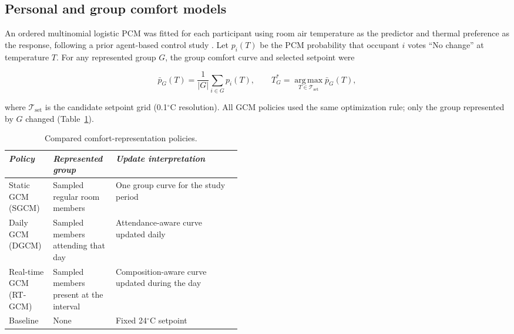 \subsection{Personal and group comfort models}
An ordered multinomial logistic PCM was fitted for each participant using room air temperature as the predictor and thermal preference as the response, following a prior agent-based control study \parencite{jung_energy_2020}.
Let $p_i(T)$ be the PCM probability that occupant $i$ votes ``No change'' at temperature $T$.
For any represented group $G$, the group comfort curve and selected setpoint were

\begin{equation}
 \bar p_G(T)=\frac{1}{|G|}\sum_{i\in G}p_i(T),
 \qquad
 T_G^*=\operatorname*{arg\,max}_{T\in\mathcal{T}_{\mathrm{set}}}\bar p_G(T),
 \label{eq:gcm}
\end{equation}

where $\mathcal{T}_{\mathrm{set}}$ is the candidate setpoint grid (0.1$^\circ$C resolution).
All GCM policies used the same optimization rule; only the group represented by $G$ changed (Table~\ref{tab:policies}).

\begin{table}[!htbp]
  \caption{Compared comfort-representation policies.}
  \label{tab:policies}
  \begin{tabularx}{\linewidth}{>{\raggedright\arraybackslash}p{0.19\linewidth}
                                >{\raggedright\arraybackslash}p{0.27\linewidth}
                                >{\raggedright\arraybackslash}X}
    \toprule
    \textit{Policy} & \textit{Represented group} & \textit{Update interpretation} \\
    \midrule
    Static GCM (SGCM) & Sampled regular room members & One group curve for the study period \\
    Daily GCM (DGCM) & Sampled members attending that day & Attendance-aware curve updated daily \\
    Real-time GCM (RT-GCM) & Sampled members present at the interval & Composition-aware curve updated during the day \\
    Baseline & None & Fixed 24$^\circ$C setpoint \\
    \bottomrule
  \end{tabularx}
\end{table}

